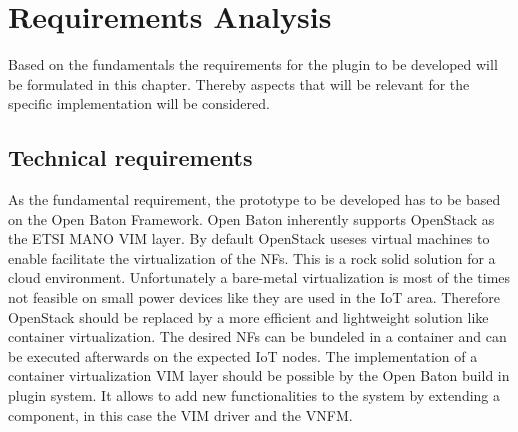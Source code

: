 \acresetall

\chapter{Requirements Analysis}\label{chapter:requirements-analysis}
Based on the fundamentals the requirements for the plugin to be developed will be formulated in this chapter.
Thereby aspects that will be relevant for the specific implementation will be considered.


\section{Technical requirements}
As the fundamental requirement, the prototype to be developed has to be based on the Open Baton Framework.
Open Baton inherently supports OpenStack as the \ac{ETSI} \ac{MANO} \ac{VIM} layer.
By default OpenStack useses virtual machines to enable facilitate the virtualization of the \acp{NF}.
This is a rock solid solution for a cloud environment.
Unfortunately a bare-metal virtualization is most of the times not feasible on small power devices like they are used in the \ac{IoT} area.
Therefore OpenStack should be replaced by a more efficient and lightweight solution like container virtualization.
The desired \acp{NF} can be bundeled in a container and can be executed afterwards on the expected \ac{IoT} nodes.
The implementation of a container virtualization \ac{VIM} layer should be possible by the Open Baton build in plugin system.
It allows to add new functionalities to the system by extending a component, in this case the \ac{VIM} driver and the \ac{VNFM}.

